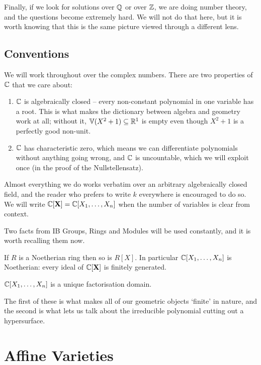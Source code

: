 \documentclass[a4paper]{scrartcl}
\newcommand{\V}{\mathbb{V}}
\begin{document}
Finally, if we look for solutions over $\mathbb{Q}$ or over $\mathbb{Z}$, we are doing number theory, and the questions become extremely hard. We will not do that here, but it is worth knowing that this is the same picture viewed through a different lens.

\subsection{Conventions}

We will work throughout over the complex numbers. There are two properties of $\mathbb{C}$ that we care about:
\begin{enumerate}[label=(\roman*)]
	\item $\mathbb{C}$ is algebraically closed -- every non-constant polynomial in one variable has a root. This is what makes the dictionary between algebra and geometry work at all; without it, $\V(X^2+1) \subseteq \R^1$ is empty even though $X^2+1$ is a perfectly good non-unit.
	\item $\mathbb{C}$ has characteristic zero, which means we can differentiate polynomials without anything going wrong, and $\mathbb{C}$ is uncountable, which we will exploit once (in the proof of the Nullstellensatz).
\end{enumerate}
Almost everything we do works verbatim over an arbitrary algebraically closed field, and the reader who prefers to write $k$ everywhere is encouraged to do so. We will write $\mathbb{C}[\mathbf{X}] = \mathbb{C}[X_1,\dots,X_n]$ when the number of variables is clear from context.

Two facts from IB Groups, Rings and Modules will be used constantly, and it is worth recalling them now.

\begin{theorem}
	If $R$ is a Noetherian ring then so is $R[X]$. In particular $\mathbb{C}[X_1,\dots,X_n]$ is Noetherian: every ideal of $\mathbb{C}[\mathbf{X}]$ is finitely generated.
\end{theorem}

\begin{theorem}
	$\mathbb{C}[X_1,\dots,X_n]$ is a unique factorisation domain.
\end{theorem}

The first of these is what makes all of our geometric objects `finite' in nature, and the second is what lets us talk about the irreducible polynomial cutting out a hypersurface.

\section{Affine Varieties}
\end{document}

